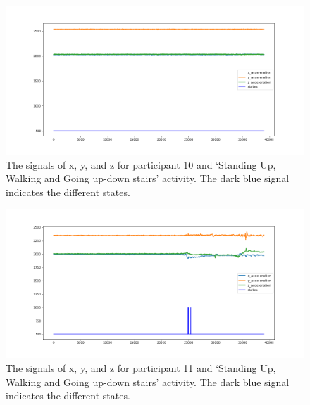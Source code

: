 \begin{figure}[H]
    \centering
    \begin{minipage}[b]{1\textwidth}
        \includegraphics[width=\textwidth]{manuscript/src/figures/Ass3/Ass3_Q2_states_user_9.png}
    \end{minipage}
    \caption{The signals of x, y, and z for participant 10 and ‘Standing  Up,  Walking  and  Going  up-down  stairs’ activity. The dark blue signal indicates the different states.}
    \label{fig:Ass3_Q2_states_user_9}
\end{figure}
\begin{figure}[H]
    \centering
    \begin{minipage}[b]{1\textwidth}
        \includegraphics[width=\textwidth]{manuscript/src/figures/Ass3/Ass3_Q2_states_user_10.png}
    \end{minipage}
    \caption{The signals of x, y, and z for participant 11 and ‘Standing  Up,  Walking  and  Going  up-down  stairs’ activity. The dark blue signal indicates the different states.}
    \label{fig:Ass3_Q2_states_user_10}
\end{figure}
